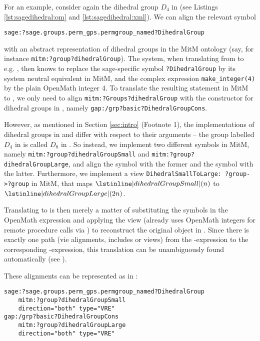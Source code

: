 For an example, consider again the dihedral group $D_4$ in \Sage (see Listings \ref{lst:sagedihedral:om} and \ref{lst:sagedihedral:xml}). We can align the relevant symbol 
\begin{lstlisting}
sage:?sage.groups.perm_gps.permgroup_named?DihedralGroup
\end{lstlisting}
with an abstract representation of dihedral groups in the MitM ontology (say, for instance \lstinline|mitm:?group?dihedralGroup|).
The \MMT system, when translating from \Sage to e.g. \GAP, then knows to replace the sage-specific symbol \lstinline|?DihedralGroup| by its system neutral equivalent in MitM, and the complex expression \lstinline+make_integer(4)+ by the plain OpenMath integer 4.
To translate the resulting statement in MitM to \GAP, we only need to align \lstinline+mitm:?Groups?dihedralGroup+ with the constructor for dihedral groups in \GAP, namely \lstinline+gap:/grp?basic?DihedralGroupCons+.

However, as mentioned in Section \ref{sec:intro} (Footnote 1), the implementations of dihedral groups in \Sage and \GAP differ with respect to their arguments -- the group labelled $D_4$ in \Sage is called $D_8$ in \GAP. So instead, we implement two different symbols in MitM, namely \lstinline|mitm:?group?dihedralGroupSmall| and \lstinline|mitm:?group?dihedralGroupLarge|, and align the \Sage symbol with the former and the \GAP symbol with the latter. Furthermore, we implement a view \lstinline|DihedralSmallToLarge: ?group->?group| in MitM, that maps $\lstinline|dihedralGroupSmall|(n)$ to $\lstinline|dihedralGroupLarge|(2n)$.


Translating to \GAP is then merely a matter of substituting the symbols in the OpenMath expression and applying the view (\GAP already uses OpenMath integers for remote procedure calls via \SCSCP) to reconstruct the original \Sage object in \GAP. Since there is exactly one path (vie alignments, includes or views) from the \Sage-expression to the corresponding \GAP-expression, this translation can be unambiguously found automatically (see \cite{MRLR:alignments:17}).

These alignments can be represented as in \ommt: 
\begin{lstlisting}[label=lst:dhalignments,caption=Alignments for Dihedral Groups]
sage:?sage.groups.perm_gps.permgroup_named?DihedralGroup
	mitm:?group?dihedralGroupSmall 
	direction="both" type="VRE"
gap:/grp?basic?DihedralGroupCons							
	mitm:?group?dihedralGroupLarge 
	direction="both" type="VRE"
\end{lstlisting}\medskip

